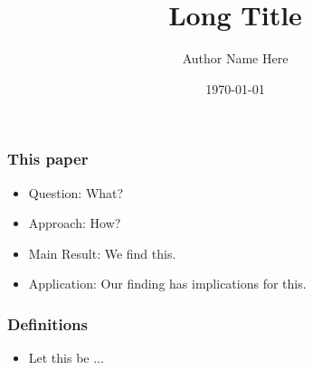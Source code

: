 \newcommand*{\MyHeaderPath}{..}%
\newcommand*{\PathToAssets}{../../assets}%
\newcommand*{\PathToOutput}{../../output}%





\title[Short Title]{
Long Title
}
\author[Short Author Name]{Author Name Here}
\date{\today}



\begin{frame}
\titlepage
\end{frame}

\begin{frame}
  \frametitle{This paper} %
  \begin{itemize}
  \item \alert{Question:} 
  What?
  \item \alert{Approach:} 
  How?
  \item \alert{Main Result:} 
  We find this.
  \item \alert{Application:}
  Our finding has implications for this.
  \end{itemize}
\end{frame}


\begin{frame}
\frametitle{Definitions}
\begin{itemize}
\item Let this be ...
\end{itemize}
\end{frame}

